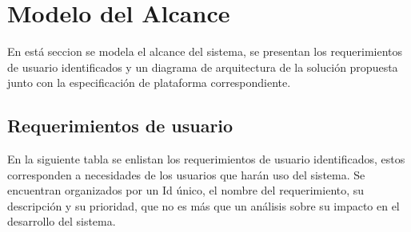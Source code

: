 \section{Modelo del Alcance}
\label{cap:reqUsr}

	En está seccion se modela el alcance del sistema, se presentan  los requerimientos de usuario identificados y un diagrama de arquitectura de la solución propuesta junto con la especificación de plataforma correspondiente.




\subsection{Requerimientos de usuario}

En la siguiente tabla se enlistan los requerimientos de usuario identificados, estos corresponden a necesidades de los usuarios que harán uso del sistema. Se encuentran organizados por un Id único, el nombre del requerimiento, su descripción y su prioridad, que no es más que un análisis sobre su impacto en el desarrollo del sistema. 

